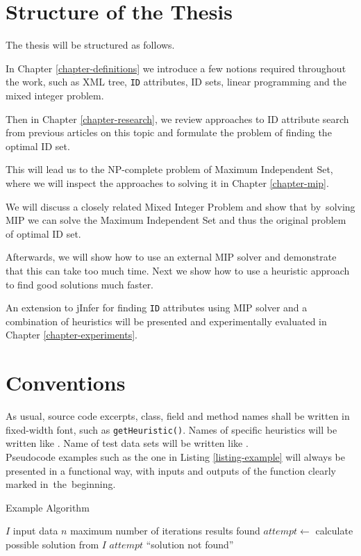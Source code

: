 \section*{Structure of the Thesis}

The thesis will be structured as follows.

In Chapter \ref{chapter-definitions} we introduce a few notions required throughout the work, such as XML tree, \texttt{ID} attributes, ID sets, linear programming and the mixed integer problem.

Then in Chapter \ref{chapter-research}, we review approaches to ID attribute search from previous articles on this topic and formulate the problem of finding the optimal ID set.

This will lead us to the NP-complete problem of Maximum Independent Set, where we will inspect the approaches to solving it in Chapter \ref{chapter-mip}.

We will discuss a closely related Mixed Integer Problem and show that by~solving MIP we can solve the Maximum Independent Set and thus the original problem of optimal ID set.

Afterwards, we will show how to use an external MIP solver and demonstrate that this can take too much time. Next we show how to use a heuristic approach to find good solutions much faster.

An extension to jInfer for finding \texttt{ID} attributes using MIP solver and a combination of heuristics will be presented and experimentally evaluated in Chapter \ref{chapter-experiments}.

\section*{Conventions}

As usual, source code excerpts, class, field and method names shall be written in fixed-width font, such as \texttt{get\-Heu\-ris\-tic()}. Names of specific heuristics will be written like . Name of test data sets will be written like .\\

Pseudocode examples such as the one in Listing \ref{listing-example} will always be presented in a functional way, with inputs and outputs of the function clearly marked in~the~beginning.

\begin{algorithm}
\caption{Example Algorithm}
\label{listing-example}
\begin{algorithmic}
\REQUIRE $I$ input data
\REQUIRE $n$ maximum number of iterations
\ENSURE results found
  \STATE {}
  \STATE $attempt \gets $ calculate possible solution from $I$
    \RETURN $attempt$
  \ENDIF
  \RETURN ``solution not found''
\ENDFOR
\end{algorithmic}
\end{algorithm}

